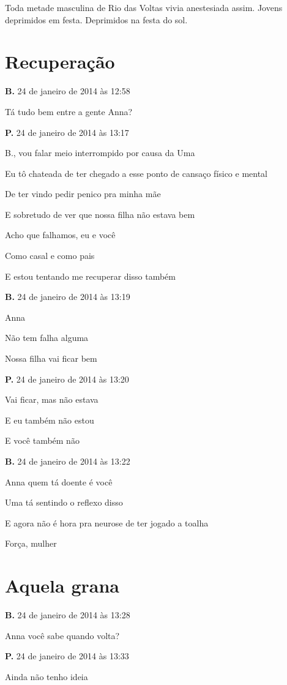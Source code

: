 Toda metade masculina de Rio das Voltas vivia anestesiada assim. Jovens
deprimidos em festa. Deprimidos na festa do sol.

\chapter{Recuperação}

\textbf{B.} 24 de janeiro de 2014 às 12:58

Tá tudo bem entre a gente Anna?

\textbf{P.} 24 de janeiro de 2014 às 13:17

B., vou falar meio interrompido por causa da Uma

Eu tô chateada de ter chegado a esse ponto de cansaço físico e mental

De ter vindo pedir penico pra minha mãe

E sobretudo de ver que nossa filha não estava bem

Acho que falhamos, eu e você

Como casal e como pais

E estou tentando me recuperar disso também

\textbf{B.} 24 de janeiro de 2014 às 13:19

Anna

Não tem falha alguma

Nossa filha vai ficar bem

\textbf{P.} 24 de janeiro de 2014 às 13:20

Vai ficar, mas não estava

E eu também não estou

E você também não

\textbf{B.} 24 de janeiro de 2014 às 13:22

Anna quem tá doente é você

Uma tá sentindo o reflexo disso

E agora não é hora pra neurose de ter jogado a toalha

Força, mulher

\chapter{Aquela grana}

\textbf{B.} 24 de janeiro de 2014 às 13:28

Anna você sabe quando volta?

\textbf{P.} 24 de janeiro de 2014 às 13:33

Ainda não tenho ideia

